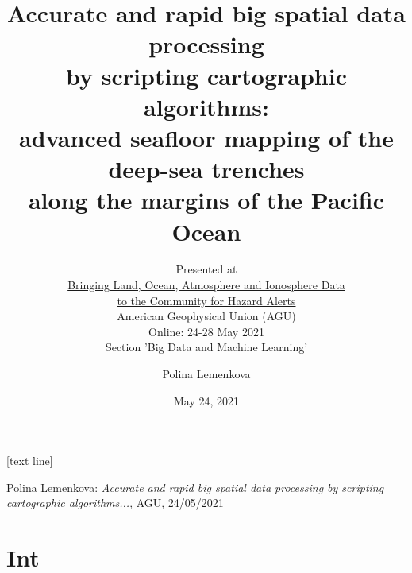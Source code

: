 \documentclass[pdflatex,compress,8pt,
	xcolor={dvipsnames,svgnames,x11names,table},
	hyperref={colorlinks = true,breaklinks = true, urlcolor = NavyBlue}]{beamer}
\title{Accurate and rapid big spatial data processing \\
by scripting cartographic algorithms: \\
advanced seafloor mapping of the deep-sea trenches \\along the margins of the Pacific Ocean}
\subtitle{Presented at \\
\href{https://agu.confex.com/agu/21workshop2/meetingapp.cgi/Home/0}{Bringing Land, Ocean, Atmosphere and Ionosphere Data \\to the Community for Hazard Alerts}\\
American Geophysical Union (AGU) \\
Online: 24-28 May 2021 \\
Section 'Big Data and Machine Learning'}
\author{Polina Lemenkova}
\date{May 24, 2021}
\begin{document}
\maketitle
[text line]{%
\parbox{\linewidth}{\vspace*{-8pt}Polina Lemenkova: \emph{Accurate and rapid big spatial data processing by scripting cartographic algorithms...}, AGU, 24/05/2021} \hfill\insertpagenumber}


\section{Int}
\end{document}
